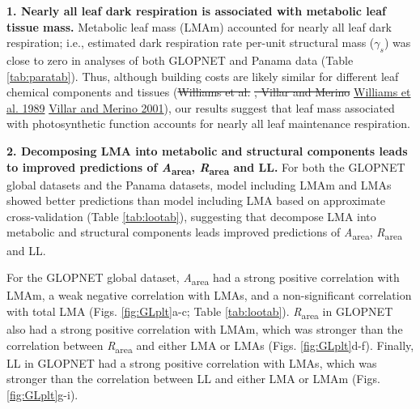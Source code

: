 \documentclass[
  12pt,
]{article}
\providecommand{\DIFaddtex}[1]{{\protect\color{blue}\uwave{#1}}} %
\providecommand{\DIFdeltex}[1]{{\protect\color{red}\sout{#1}}}                      %
\providecommand{\DIFaddbegin}{} %
\providecommand{\DIFaddend}{} %
\providecommand{\DIFdelbegin}{} %
\providecommand{\DIFdelend}{} %
\providecommand{\DIFadd}[1]{\texorpdfstring{\DIFaddtex{#1}}{#1}} %
\providecommand{\DIFdel}[1]{\texorpdfstring{\DIFdeltex{#1}}{}} %
\newcommand{\DIFscaledelfig}{0.5}
\newlength{\DIFdelgraphicswidth} %
\newlength{\DIFdelgraphicsheight} %
\newcommand{\DIFaddincludegraphics}[2][]{{\color{blue}\fbox{\DIFOincludegraphics[#1]{#2}}}} %
\newcommand{\DIFdelincludegraphics}[2][]{%
\sbox{\DIFdelgraphicsbox}{\DIFOincludegraphics[#1]{#2}}%
\settoboxwidth{\DIFdelgraphicswidth}{\DIFdelgraphicsbox} %
\settoboxtotalheight{\DIFdelgraphicsheight}{\DIFdelgraphicsbox} %
\scalebox{\DIFscaledelfig}{%
\parbox[b]{\DIFdelgraphicswidth}{\usebox{\DIFdelgraphicsbox}\\[-\baselineskip] \rule{\DIFdelgraphicswidth}{0em}}\llap{\resizebox{\DIFdelgraphicswidth}{\DIFdelgraphicsheight}{%
\setlength{\unitlength}{\DIFdelgraphicswidth}%
\begin{picture}(1,1)%
\thicklines\linethickness{2pt} %
{\color[rgb]{1,0,0}\put(0,0){\framebox(1,1){}}}%
{\color[rgb]{1,0,0}\put(0,0){\line( 1,1){1}}}%
{\color[rgb]{1,0,0}\put(0,1){\line(1,-1){1}}}%
\end{picture}%
}\hspace*{3pt}}} %
} %
\DeclareRobustCommand{\DIFaddbegin}{\DIFOaddbegin \let\includegraphics\DIFaddincludegraphics} %
\DeclareRobustCommand{\DIFaddend}{\DIFOaddend \let\includegraphics\DIFOincludegraphics} %
\DeclareRobustCommand{\DIFdelbegin}{\DIFOdelbegin \let\includegraphics\DIFdelincludegraphics} %
\DeclareRobustCommand{\DIFdelend}{\DIFOaddend \let\includegraphics\DIFOincludegraphics} %
\begin{document}
\textbf{1. Nearly all leaf dark respiration is associated with metabolic leaf tissue mass.}
Metabolic leaf mass (LMAm) accounted for nearly all leaf dark respiration; i.e., estimated dark respiration rate per-unit structural mass (\(\gamma_s\)) was close to zero in analyses of both GLOPNET and Panama data (Table \ref{tab:paratab}).
Thus, although building costs are likely similar for different leaf chemical components and tissues (\DIFdelbegin \DIFdel{Williams et al. }\DIFdelend \protect\DIFdelbegin %
\DIFdel{, Villar and Merino }\DIFdelend \DIFaddbegin \hyperlink{ref-Williams1989}{Williams et al. 1989}\DIFadd{, }\DIFaddend \protect\DIFdelbegin %
\DIFdelend \DIFaddbegin \hyperlink{ref-Villar2001}{Villar and Merino 2001}\DIFaddend ), our results suggest that leaf mass associated with photosynthetic function accounts for nearly all leaf maintenance respiration.

\textbf{2. Decomposing LMA into metabolic and structural components leads to improved predictions of \emph{A}\textsubscript{area}, \emph{R}\textsubscript{area} and LL.}
For both the GLOPNET global datasets and the Panama datasets, model including LMAm and LMAs showed better predictions than model including LMA based on approximate cross-validation (Table \ref{tab:lootab}), suggesting that decompose LMA into metabolic and structural components leads improved predictions of \emph{A}\textsubscript{area}, \emph{R}\textsubscript{area} and LL.

For the GLOPNET global dataset, \emph{A}\textsubscript{area} had a strong positive correlation with LMAm, a weak negative correlation with LMAs, and a non-significant correlation with total LMA (Figs. \DIFaddbegin \DIFadd{Fig.~}\DIFaddend \ref{fig:GLplt}a-c; Table \ref{tab:lootab}).
\emph{R}\textsubscript{area} in GLOPNET also had a strong positive correlation with LMAm, which was stronger than the correlation between \emph{R}\textsubscript{area} and either LMA or LMAs (Figs. \DIFaddbegin \DIFadd{Fig.~}\DIFaddend \ref{fig:GLplt}d-f).
Finally, LL in GLOPNET had a strong positive correlation with LMAs, which was stronger than the correlation between LL and either LMA or LMAm (Figs. \DIFaddbegin \DIFadd{Fig.~}\DIFaddend \ref{fig:GLplt}g-i).
\end{document}
